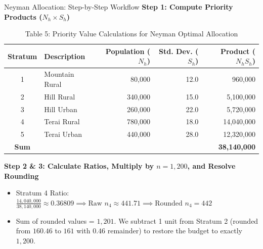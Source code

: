 \documentclass[10pt, aspectratio=169]{beamer}
\begin{document}
  \begin{frame}{Neyman Allocation: Step-by-Step Workflow}
      \textbf{Step 1: Compute Priority Products ($N_h \times S_h$)}
      \begin{table}
          \caption{Table 5: Priority Value Calculations for Neyman Optimal Allocation}
          \tiny
          \begin{tabularx}{0.85\textwidth}{clrrr}
              \toprule
              \textbf{Stratum} & \textbf{Description} & \textbf{Population ($N_h$)} & \textbf{Std. Dev. ($S_h$)} & \textbf{Product ($N_h S_h$)} \\
              \midrule
              1 & Mountain Rural & 80,000 & 12.0 & 960,000 \\
              2 & Hill Rural & 340,000 & 15.0 & 5,100,000 \\
              3 & Hill Urban & 260,000 & 22.0 & 5,720,000 \\
              4 & Terai Rural & 780,000 & 18.0 & 14,040,000 \\
              5 & Terai Urban & 440,000 & 28.0 & 12,320,000 \\
              \midrule
              \textbf{Sum} & & & & \textbf{38,140,000} \\
              \bottomrule
          \end{tabularx}
      \end{table}
      
      \textbf{Step 2 \& 3: Calculate Ratios, Multiply by $n = 1,200$, and Resolve Rounding}
      \begin{itemize}
          \item Stratum 4 Ratio: $\frac{14,040,000}{38,140,000} \approx 0.36809 \implies \text{Raw } n_4 \approx 441.71 \implies \text{Rounded } n_4 = 442$
          \item Sum of rounded values = $1,201$. We subtract 1 unit from Stratum 2 (rounded from $160.46$ to $161$ with $0.46$ remainder) to restore the budget to exactly $1,200$.
      \end{itemize}
  \end{frame}
  
\end{document}
